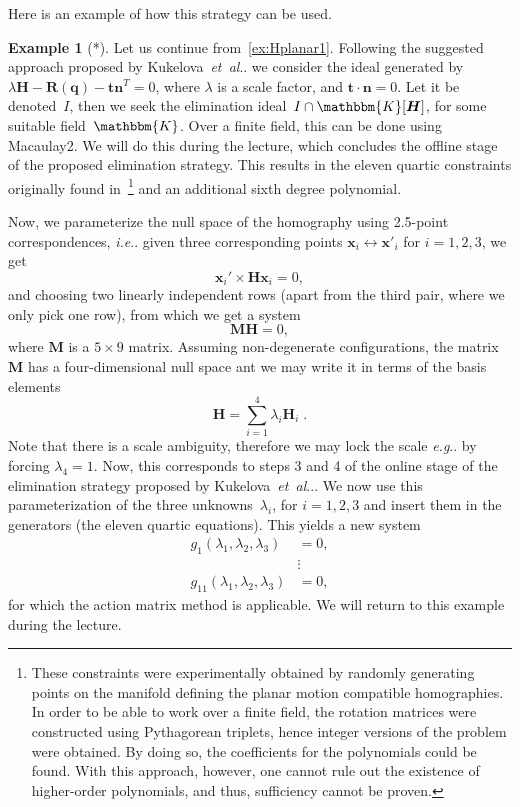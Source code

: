 \documentclass[11pt,a4paper]{article}
\makeatletter
\theoremstyle{definition}
\newtheorem{example}{Example}
\newcommand{\mat}[1]{\bm{#1}}
\newcommand{\K}{\ensuremath{\mathbbm{K}}}
\DeclareRobustCommand\eg{\emph{e.g}\@ifnextchar.{}{.\@}}
\DeclareRobustCommand\etal{\emph{et~al}\@ifnextchar.{}{.\@}}
\DeclareRobustCommand\ie{\emph{i.e}\@ifnextchar.{}{.\@}}
\makeatother
\begin{document}
Here is an example of how this strategy can be used.
\begin{example}[*]
Let us continue from~\cref{ex:Hplanar1}.
Following the suggested approach proposed by Kukelova~\etal{} we
consider the ideal generated by
\mbox{$\lambda \mat{H}-\mat{R}(\mat{q})-\mat{tn}^{T}=0$}, where $\lambda$ is a scale factor,
and $\mat{t}\cdot\mat{n}=0$. Let it be denoted~$I$,
then we seek the elimination ideal~$I\cap\K[\mat{H}]$, for some suitable field~$\K$.
Over a finite field, this can be done using Macaulay2. We will do this during the lecture, which
concludes the offline stage of the proposed elimination strategy.
This results in the eleven quartic constraints originally found
in~\cite{wadenback2016}\footnote{
These constraints were experimentally obtained by randomly generating points on the manifold defining
the planar motion compatible homographies.
In order to be able to work over a finite field, the rotation matrices were constructed
using Pythagorean triplets, hence integer versions of the problem were obtained. By doing so,
the coefficients for the polynomials could be found.
With this approach, however, one cannot rule out the existence of higher-order polynomials,
and thus, sufficiency cannot be proven.} and an additional sixth degree polynomial.

Now, we parameterize the null space of the homography using 2.5-point correspondences, \ie{}
given three corresponding points $\mat{x}_i \leftrightarrow \mat{x}'_i$ for $i=1,2,3$, we get
\begin{equation}
    \mat{x}_i'\times \mat{Hx}_i = 0,
\end{equation}
and choosing two linearly independent rows (apart from the third pair, where we only pick one row),
from which we get a system
\begin{equation}
\mat{M}\mat{H} = 0,
\end{equation}
where $\mat{M}$ is a $5\times 9$ matrix. Assuming non-degenerate configurations, the matrix $\mat{M}$
has a four-dimensional null space ant we may write it in terms of the basis elements
\begin{equation}
    \mat{H} = \sum_{i=1}^4\lambda_i\mat{H}_i\;.
\end{equation}
Note that there is a scale ambiguity, therefore we may lock the scale \eg{} by forcing \mbox{$\lambda_4=1$}.
Now, this corresponds to steps 3 and 4 of the online stage of the elimination strategy proposed by
Kukelova~\etal{}. We now use this parameterization of the three unknowns~$\lambda_i$, for $i=1,2,3$
and insert them in the generators (the eleven quartic equations). This yields a new system
\begin{equation}
\begin{aligned}
    g_1(\lambda_1,\lambda_2,\lambda_3) &= 0, \\
    &\vdots \\
    g_{11}(\lambda_1,\lambda_2,\lambda_3) &= 0,
\end{aligned}
\end{equation}
for which the action matrix method is applicable. We will return to this example during the lecture.
\end{example}
\end{document}
